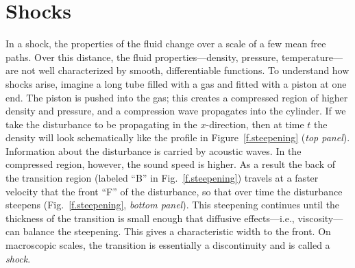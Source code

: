 \chapter{Shocks}
\newcommand{\gpo}{\ensuremath{(\gamma+1)}}
\newcommand{\gmo}{\ensuremath{(\gamma-1)}}

In a shock, the properties of the fluid change over a scale of a few mean free paths.  Over this distance, the fluid properties---density, pressure, temperature---are not well characterized by smooth, differentiable functions. To understand how shocks arise, imagine a long tube filled with a gas and fitted with a piston at one end. The piston is pushed into the gas; this creates a compressed region of higher density and pressure, and a compression wave propagates into the cylinder.  If we take the disturbance to be propagating in the $x$-direction, then at time $t$ the density will look schematically like the profile in Figure~\ref{f.steepening} (\emph{top panel}).
Information about the disturbance is carried by acoustic waves.  In the compressed region, however, the sound speed is higher.  As a result the back of the transition region (labeled ``B'' in Fig.~\ref{f.steepening}) travels at a faster velocity that the front ``F'' of the disturbance, so that over time the disturbance steepens (Fig.~\ref{f.steepening}, \emph{bottom panel}). This steepening continues until the thickness of the transition is small enough that diffusive effects---i.e., viscosity---can balance the steepening.  This gives a characteristic width to the front.  On macroscopic scales, the transition is essentially a discontinuity and is called a \emph{shock}.

